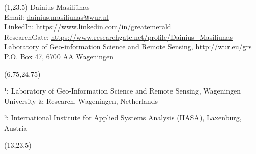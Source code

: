 \documentclass[20pt]{beamer}
\begin{document}
\begin{frame}{}
	\begin{textblock}{7}(1,23.5)
		\small{\color{wursignblue}
            Dainius Masiliūnas\\
			Email: \url{dainius.masiliunas@wur.nl}\\
			LinkedIn: \url{https://www.linkedin.com/in/greatemerald} \\
			ResearchGate: \url{https://www.researchgate.net/profile/Dainius_Masiliunas} \\
			Laboratory of Geo-information Science and Remote Sensing, \url{http://wur.eu/grs}\\
			P.O. Box 47, 6700 AA Wageningen
		}
	\end{textblock}
	
% 	

    \begin{textblock}{5}(6.75,24.75)
        {\footnotesize ¹: Laboratory of Geo-Information Science and Remote Sensing, Wageningen University \& Research, Wageningen, Netherlands
        
        ²: International Institute for Applied Systems Analysis (IIASA), Laxenburg, Austria}
    \end{textblock}

 	\begin{textblock}{5}(13,23.5)
          \hskip 1cm 
 	\end{textblock}


  \end{frame}
\end{document}
